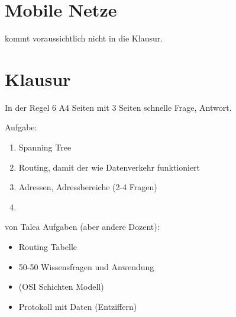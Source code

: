 \documentclass[a4paper]{article}
\title{\docTitle}
\author{Moritz}
\date{\today}
\begin{document}
\maketitle
\tableofcontents


\section{Mobile Netze}

kommt voraussichtlich nicht in die Klausur.


\section{Klausur}

In der Regel 6 A4 Seiten mit 3 Seiten schnelle Frage, Antwort.

Aufgabe:

\begin{enumerate}
    \item Spanning Tree
    \item Routing, damit der wie Datenverkehr funktioniert
    \item Adressen, Adressbereiche (2-4 Fragen)
    \item 
\end{enumerate}


von Talea Aufgaben (aber andere Dozent):

\begin{itemize}
    \item Routing Tabelle
    \item 50-50 Wissensfragen und Anwendung
    \item (OSI Schichten Modell)
    \item Protokoll mit Daten (Entziffern)
\end{itemize}
\end{document}

